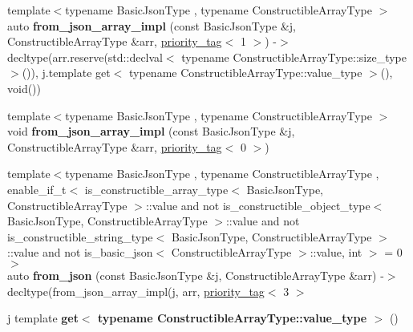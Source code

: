 \begin{DoxyCompactItemize}
\mbox{\label{namespacenlohmann_1_1detail_a464e1246f3df7edea79c3f81ab701edd}} 
{\footnotesize template$<$typename Basic\+Json\+Type , typename Constructible\+Array\+Type $>$ }\\auto {\bfseries from\+\_\+json\+\_\+array\+\_\+impl} (const Basic\+Json\+Type \&j, Constructible\+Array\+Type \&arr, \mbox{\hyperlink{structnlohmann_1_1detail_1_1priority__tag}{priority\+\_\+tag}}$<$ 1 $>$) -\/$>$ decltype(arr.\+reserve(std\+::declval$<$ typename Constructible\+Array\+Type\+::size\+\_\+type $>$()), j.\+template get$<$ typename Constructible\+Array\+Type\+::value\+\_\+type $>$(), void())
\item 
\mbox{\label{namespacenlohmann_1_1detail_a20cf21255e75cff1ffb0869c2c545e63}} 
{\footnotesize template$<$typename Basic\+Json\+Type , typename Constructible\+Array\+Type $>$ }\\void {\bfseries from\+\_\+json\+\_\+array\+\_\+impl} (const Basic\+Json\+Type \&j, Constructible\+Array\+Type \&arr, \mbox{\hyperlink{structnlohmann_1_1detail_1_1priority__tag}{priority\+\_\+tag}}$<$ 0 $>$)
\item 
\mbox{\label{namespacenlohmann_1_1detail_a14d8cdf544585f1c38eab6a0820e55f7}} 
{\footnotesize template$<$typename Basic\+Json\+Type , typename Constructible\+Array\+Type , enable\+\_\+if\+\_\+t$<$ is\+\_\+constructible\+\_\+array\+\_\+type$<$ Basic\+Json\+Type, Constructible\+Array\+Type $>$\+::value and not is\+\_\+constructible\+\_\+object\+\_\+type$<$ Basic\+Json\+Type, Constructible\+Array\+Type $>$\+::value and not is\+\_\+constructible\+\_\+string\+\_\+type$<$ Basic\+Json\+Type, Constructible\+Array\+Type $>$\+::value and not is\+\_\+basic\+\_\+json$<$ Constructible\+Array\+Type $>$\+::value, int $>$  = 0$>$ }\\auto {\bfseries from\+\_\+json} (const Basic\+Json\+Type \&j, Constructible\+Array\+Type \&arr) -\/$>$ decltype(from\+\_\+json\+\_\+array\+\_\+impl(j, arr, \mbox{\hyperlink{structnlohmann_1_1detail_1_1priority__tag}{priority\+\_\+tag}}$<$ 3 $>$
\item 
\mbox{\label{namespacenlohmann_1_1detail_ad9e016d7b6a3cd2847027950aa0aac3b}} 
j template {\bfseries get$<$ typename Constructible\+Array\+Type\+::value\+\_\+type $>$} ()
\item 

\end{DoxyCompactItemize}
